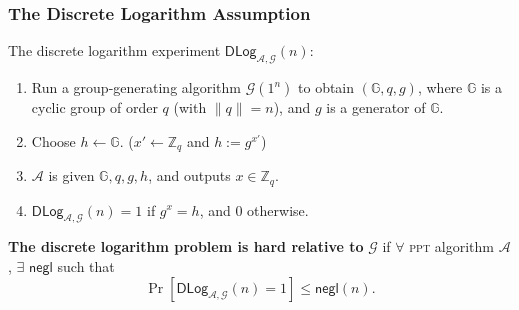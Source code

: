 \begin{comment}
\begin{frame}\frametitle{The Baby-Step/Giant-Step Algorithm}
\begin{figure}
\begin{center}

\end{center}
\end{figure}
\begin{algorithm}[H]
\SetKwInOut{Input}{input}
\SetKwInOut{Output}{output}
\SetKw{KwC}{compute}
\SetKw{KwS}{sort}
\DontPrintSemicolon
\caption{The baby-step/giant-step algorithm}
\Input{$g \in \mathbb{G}$ and $y \in \langle g \rangle$; $q=\mathsf{ord}(g)$ ($t := \lfloor \sqrt{q}\rfloor$)}
\Output{$\log_g y$}
\BlankLine

\lFor{$i = 0$ \KwTo $\lfloor q/t \rfloor$}{\KwC $g_i := g^{i\cdot t}$ \tcc*[f]{giant steps}}\; 
\KwS the pairs $(i,g_i)$ by $g_i$\;
\For{$i = 0$ \KwTo $t$}{
\KwC $y_i := y\cdot g^i$ \tcc*[f]{baby steps}\;
\lIf{$y_i = g_k$ for some $k$}{\Return $[kt-i \bmod q]$}\;
}
\end{algorithm}
The time complexity is $\mathcal{O}(\sqrt{q}\cdot \mathsf{polylog}(q))$.
\end{frame}
\begin{frame}\frametitle{Example of Baby-Step/Giant-Step Algorithm}
\begin{exampleblock}{In $\mathbb{Z}^*_{29}$, $q=28$, $g=2$, $y=17$.}
$t=5$, compute the giant steps:
\[2^0=1,\; 2^5=?,\; 2^{10}=?,\; 2^{15}=?,\; 2^{20}=?,\; 2^{25}=? \]
compute the baby steps:
\[17\cdot 2^0=17,\; 17\cdot 2^1=?,\; 17\cdot 2^2=?,\]
\[ 17\cdot 2^3=?,\; 17\cdot 2^4=?,\; 17\cdot 2^5=?\]
$2^{x} = 17\cdot 2^y$. So $\log_2 17=x-y=21$
\end{exampleblock}
\end{frame}
\end{comment}
\begin{frame}\frametitle{The Discrete Logarithm Assumption}
The discrete logarithm experiment $\mathsf{DLog}_{\mathcal{A},\mathcal{G}}(n)$:
\begin{enumerate}
\item Run a group-generating algorithm $\mathcal{G}(1^n)$ to obtain $(\mathbb{G},q,g)$, where $\mathbb{G}$ is a cyclic group of order $q$ (with $\|q\|=n$), and $g$ is a generator of $\mathbb{G}$.
\item Choose $h \gets \mathbb{G}$. ($x' \gets \mathbb{Z}_q$ and $h := g^{x'}$)
\item $\mathcal{A}$ is given $\mathbb{G}, q, g, h$, and outputs $x \in \mathbb{Z}_q$.
\item $\mathsf{DLog}_{\mathcal{A},\mathcal{G}}(n) = 1$ if $g^x = h$, and 0 otherwise. 
\end{enumerate}
\begin{definition}
\textbf{The discrete logarithm problem is hard relative to} $\mathcal{G}$ if $\forall$ \textsc{ppt} algorithm $\mathcal{A}$, $\exists$ $\mathsf{negl}$ such that
\[ \Pr[\mathsf{DLog}_{\mathcal{A},\mathcal{G}}(n)=1] \le \mathsf{negl}(n).\]
\end{definition}
\end{frame}

